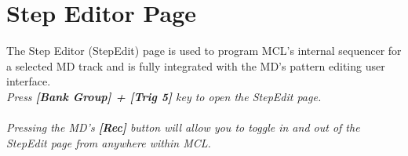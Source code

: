 \chapter{Step Editor Page}
The Step Editor (StepEdit) page is used to program MCL's internal sequencer for a selected MD track and is fully integrated with the MD's pattern editing user interface.
\\
\textit{Press \textbf{[Bank Group] + [Trig 5]} key to open the StepEdit page.}\\\\
\textit{Pressing the MD's \textbf{[Rec]} button will allow you to toggle in and out of the StepEdit page from anywhere within MCL.}

\newpage
